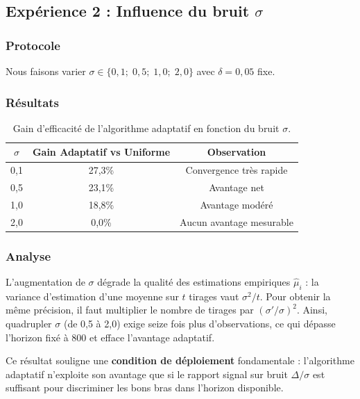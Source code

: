 \documentclass[11pt,a4paper]{article}
\begin{document}
\subsection{Expérience 2 : Influence du bruit $\sigma$}

\subsubsection{Protocole}

Nous faisons varier $\sigma \in \{0{,}1;\; 0{,}5;\; 1{,}0;\; 2{,}0\}$
avec $\delta = 0{,}05$ fixe.

\subsubsection{Résultats}

\begin{table}[H]
\centering
\begin{tabular}{ccc}
\hline
$\sigma$ & Gain Adaptatif vs Uniforme & Observation \\
\hline
0,1 & 27,3\% & Convergence très rapide \\
0,5 & 23,1\% & Avantage net \\
1,0 & 18,8\% & Avantage modéré \\
2,0 &  0,0\% & Aucun avantage mesurable \\
\hline
\end{tabular}
\caption{Gain d'efficacité de l'algorithme adaptatif en fonction du bruit $\sigma$.}
\label{tab:sigma}
\end{table}

\subsubsection{Analyse}

L'augmentation de $\sigma$ dégrade la qualité des estimations empiriques
$\hat{\mu}_i$ : la variance d'estimation d'une moyenne sur $t$ tirages
vaut $\sigma^2 / t$. Pour obtenir la même précision, il faut multiplier
le nombre de tirages par $(\sigma'/\sigma)^2$. Ainsi, quadrupler $\sigma$
(de 0,5 à 2,0) exige seize fois plus d'observations, ce qui dépasse
l'horizon fixé à 800 et efface l'avantage adaptatif.

Ce résultat souligne une \textbf{condition de déploiement} fondamentale :
l'algorithme adaptatif n'exploite son avantage que si le rapport signal
sur bruit $\Delta/\sigma$ est suffisant pour discriminer les bons bras
dans l'horizon disponible.
\end{document}
